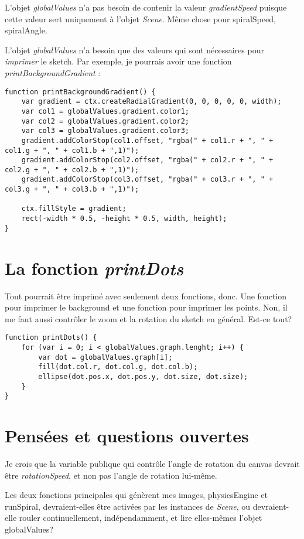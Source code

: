 L'objet \textit{globalValues} n'a pas besoin de contenir la valeur \textit{gradientSpeed} puisque cette valeur sert uniquement à l'objet \textit{Scene}. Même chose pour spiralSpeed, spiralAngle.

L'objet \textit{globalValues} n'a besoin que des valeurs qui sont nécessaires pour \textit{imprimer} le sketch. Par exemple, je pourrais avoir une fonction \textit{printBackgroundGradient} : 

\begin{lstlisting}
function printBackgroundGradient() {
    var gradient = ctx.createRadialGradient(0, 0, 0, 0, 0, width);
    var col1 = globalValues.gradient.color1;
    var col2 = globalValues.gradient.color2;
    var col3 = globalValues.gradient.color3;
    gradient.addColorStop(col1.offset, "rgba(" + col1.r + ", " + col1.g + ", " + col1.b + ",1)");
    gradient.addColorStop(col2.offset, "rgba(" + col2.r + ", " + col2.g + ", " + col2.b + ",1)");
    gradient.addColorStop(col3.offset, "rgba(" + col3.r + ", " + col3.g + ", " + col3.b + ",1)");

    ctx.fillStyle = gradient;
    rect(-width * 0.5, -height * 0.5, width, height);
}
\end{lstlisting}

\section{La fonction \textit{printDots}}

Tout pourrait être imprimé avec seulement deux fonctions, donc. Une fonction pour imprimer le background et une fonction pour imprimer les points. Non, il me faut aussi contrôler le zoom et la rotation du sketch en général. Est-ce tout?

\begin{lstlisting}
function printDots() {
    for (var i = 0; i < globalValues.graph.lenght; i++) {
        var dot = globalValues.graph[i];
        fill(dot.col.r, dot.col.g, dot.col.b);
        ellipse(dot.pos.x, dot.pos.y, dot.size, dot.size);
    }
}
\end{lstlisting}


\section{Pensées et questions ouvertes} 
Je crois que la variable publique qui contrôle l'angle de rotation du canvas devrait être \textit{rotationSpeed}, et non pas l'angle de rotation lui-même. 

Les deux fonctions principales qui génèrent mes images, physicsEngine et runSpiral, devraient-elles être activées par les instances de \textit{Scene}, ou devraient-elle rouler continuellement, indépendamment, et lire elles-mêmes l'objet globalValues?


